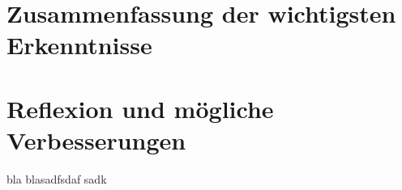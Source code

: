 
\section{Zusammenfassung der wichtigsten Erkenntnisse}
\section{Reflexion und mögliche Verbesserungen}
bla blasadfsdaf sadk
\clearpage  